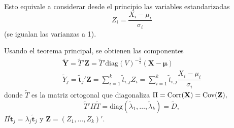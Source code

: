Esto equivale a considerar desde el principio las variables estandarizadas \[ Z_i=\dfrac{X_i-\mu_i}{\sigma_i} \](se igualan las varianzas a 1).

Usando el teorema principal, se obtienen las componentes \[ \begin{array}{c}
	\mathbf{\tilde{Y}}=\tilde{T}'\mathbf{Z}=\tilde{T}'\mathrm{diag}(V)^{-\frac{1}{2}}(\mathbf{X-\mu})\\
	\tilde{Y}_j=\mathbf{\tilde{t}}_j'\mathbf{Z}=\sum_{i=1}^{k}\tilde{t}_{i,j}Z_i=\sum_{i=1}^{k}\tilde{t}_{i,j}\dfrac{X_i-\mu_i}{\sigma_i}
\end{array} \]donde $\tilde{T}$ es la matriz ortogonal que diagonaliza $\Pi=\operatorname{Corr}(\mathbf{X})=\operatorname{Cov}(\mathbf{Z}),$ \[ \tilde{T}'\Pi\tilde{T}=\mathrm{diag}(\tilde{\lambda}_1,\dots,\tilde{\lambda}_k)=\tilde{D}, \]$\Pi\mathbf{\tilde{t}}_j=\lambda_j\mathbf{\tilde{t}}_j$ y $\mathbf{Z}=(Z_1,\dots,Z_k)'$.


